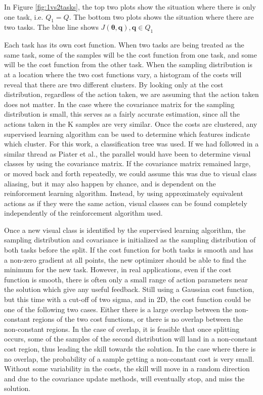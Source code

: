\documentclass[12pt]{article}
\newcommand{\taskp}  {\ensuremath{\mathbf{q}}}
\newcommand{\costf}  {\ensuremath{J}}
\newcommand{\app}    {\ensuremath{\bm{\theta}}}
\newcommand{\taskpsp}{\ensuremath{Q}}
\begin{document}
In Figure \ref{fig:1vs2tasks}, the top two plots show the situation where there is only one task, i.e. $\taskpsp_1 = \taskpsp$. The bottom two plots shows the situation where there are two tasks. The blue line shows $\costf(\app,\taskp), \taskp \in \taskpsp_1$

\color{red}Each task has its own cost function. When two tasks are being treated as the same task, some of the samples will be the cost function from one task, and some will be the cost function from the other task. \color{black} When the sampling distribution is at a location where the two cost functions vary, a histogram of the costs will reveal that there are two different clusters. By looking only at the cost distribution, regardless of the action taken, we are assuming that the action taken does not matter. In the case where the covariance matrix for the sampling distribution is small, this serves as a fairly accurate estimation, since all the actions taken in the K samples are very similar. Once the costs are clustered, any supervised learning algorithm can be used to determine which features indicate which cluster. For this work, a classification tree was used. If we had followed in a similar thread as Piater et al., the parallel would have been to determine visual classes by using the covariance matrix. If the covariance matrix remained large, or moved back and forth repeatedly, we could assume this was due to visual class aliasing, but it may also happen by chance, and is dependent on the reinforcement learning algorithm. Instead, by using approximately equivalent actions as if they were the same action, visual classes can be found completely independently of the reinforcement algorithm used. 

Once a new visual class is identified by the supervised learning algorithm, the sampling distribution and covariance is initialized as the sampling distribution of both tasks before the split. If the cost function for both tasks is smooth and has a non-zero gradient at all points, the new optimizer should be able to find the minimum for the new task. However, in real applications, even if the cost function is smooth, there is often only a small range of action parameters near the solution which give any useful feedback. Still using a Gaussian cost function, but this time with a cut-off of two sigma, and in 2D, the cost function could be one of the following two cases. Either there is a large overlap between the non-constant regions of the two cost functions, or there is no overlap between the non-constant regions. In the case of overlap, it is feasible that once splitting occurs, some of the samples of the second distribution will land in a non-constant cost region, thus leading the skill towards the solution. In the case where there is no overlap, the probability of a sample getting a non-constant cost is very small. Without some variability in the costs, the skill will move in a random direction and due to the covariance update methods, will eventually stop, and miss the solution.
 
\end{document}
